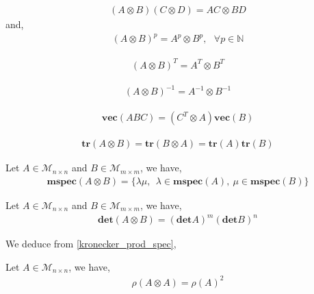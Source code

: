 \begin{proposition}
\begin{align}
( A \otimes B ) ( C \otimes D ) = AC \otimes BD
\end{align}
and,
\begin{align}
( A \otimes B ) ^p = A^p \otimes B^p,~~~\forall p \in \mathbb{N}
\end{align}
\end{proposition}

\begin{proposition}
\begin{align}
( A \otimes B )^T = A^T \otimes B^T
\end{align}
\end{proposition}

\begin{proposition}
\begin{align}
( A \otimes B )^{-1} = A^{-1} \otimes B^{-1}
\end{align}
\end{proposition}

\begin{proposition}
\begin{align}
\label{kronecker_vec_abc}
\mathbf{vec} ( ABC ) = ( C^T \otimes A ) \mathbf{vec} ( B )
\end{align}
\end{proposition}

\begin{proposition}
\begin{align}
\mathbf{tr} ( A \otimes B ) = \mathbf{tr} ( B \otimes A ) =  \mathbf{tr} ( A ) \mathbf{tr} ( B )
\end{align}
\end{proposition}

\begin{proposition}
Let $A \in \mathcal{M}_{n \times n}$ and $B \in \mathcal{M}_{m \times m}$, we have,
\begin{align}
\label{kronecker_prod_spec}
\mathbf{mspec} ( A \otimes B ) = \{ \lambda \mu,~~\lambda \in \mathbf{mspec}(A),~\mu \in \mathbf{mspec}(B) \}
\end{align}
\end{proposition}

\begin{proposition}
Let $A \in \mathcal{M}_{n \times n}$ and $B \in \mathcal{M}_{m \times m}$, we have,
\begin{align}
\mathbf{det} ( A \otimes B ) = ( \mathbf{det} A )^m ( \mathbf{det} B )^n
\end{align}
\end{proposition}
We deduce from \ref{kronecker_prod_spec},
\begin{proposition}
Let $A \in \mathcal{M}_{n \times n}$, we have,
\begin{align}
\rho ( A \otimes A ) = \rho ( A )^2
\end{align}
\end{proposition}

